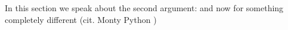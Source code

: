 In this section we speak about the second argument: and now for something completely different (cit. Monty Python \cite{MontyPython})
